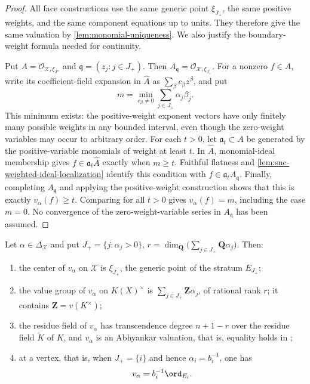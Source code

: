 \begin{proof}
All face constructions use the same generic point $\xi_{J_+}$, the
same positive weights, and the same component equations up to units.
They therefore give the same valuation by \cref{lem:monomial-uniqueness}.
We also justify the boundary-weight formula needed for continuity.

Put $A=\mathcal O_{\mathcal X,\xi_{J''}}$ and
$\mathfrak q=(z_j:j\in J_+)$. Then
$A_{\mathfrak q}=\mathcal O_{\mathcal X,\xi_{J_+}}$. For a nonzero
$f\in A$, write its coefficient-field expansion in $\widehat A$ as
$\sum_\beta c_\beta z^\beta$, and put
\[
 m=\min_{c_\beta\neq0}\sum_{j\in J_+}\alpha_j\beta_j.
\]
This minimum exists: the positive-weight exponent vectors have only
finitely many possible weights in any bounded interval, even though the
zero-weight variables may occur to arbitrary order. For each $t>0$, let
$\mathfrak a_t\subset A$ be generated by the positive-variable monomials
of weight at least $t$. In $\widehat A$, monomial-ideal membership gives
$f\in\mathfrak a_t\widehat A$ exactly when $m\ge t$. Faithful flatness
and \cref{lem:snc-weighted-ideal-localization} identify this condition with
$f\in\mathfrak a_tA_{\mathfrak q}$. Finally, completing
$A_{\mathfrak q}$ and applying the positive-weight construction shows
that this is exactly $v_\alpha(f)\ge t$. Comparing for all $t>0$ gives
$v_\alpha(f)=m$, including the case $m=0$. No convergence of the
zero-weight-variable series in $A_{\mathfrak q}$ has been assumed.
\end{proof}

\begin{lemma}
\label{lem:skeleton-monomial-invariants}
Let $\alpha\in\Delta_{\mathcal X}$ and put
$J_+=\{j:\alpha_j>0\}$, $r=\dim_{\mathbf Q}
\bigl(\sum_{j\in J_+}\mathbf Q\alpha_j\bigr)$. Then:
\begin{enumerate}
\item the center of $v_\alpha$ on $\mathcal X$ is $\xi_{J_+}$, the
  generic point of the stratum $E_{J_+}$;
\item the value group of $v_\alpha$ on $K(X)^\times$ is
  $\sum_{j\in J_+}\mathbf Z\alpha_j$, of rational rank $r$; it contains
  $\mathbf Z=v(K^\times)$;
\item the residue field of $v_\alpha$ has transcendence degree
  $n+1-r$ over the residue field $\widetilde K$ of $K$, and
  $v_\alpha$ is an Abhyankar valuation, that is, equality holds in
  ;
\item at a vertex, that is, when $J_+=\{i\}$ and hence
  $\alpha_i=b_i^{-1}$, one has
  \[
                        v_\alpha=b_i^{-1}\ord_{E_i}.
  \]
\end{enumerate}
\end{lemma}

